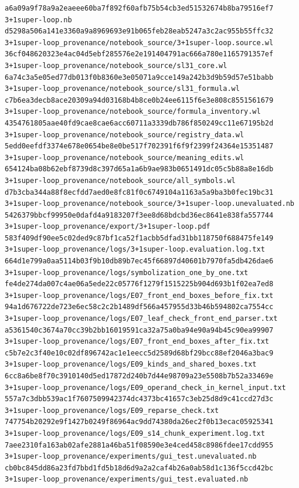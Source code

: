 \documentclass[
  10pt,
]{article}
\begin{document}
\begin{verbatim}
a6a09a9f78a9a2eaeee60ba7f892f60afb75b54cb3ed51532674b8ba79516ef7  3+1super-loop.nb
d5298a506a141e3360a9a8969693e91b065feb28eab5247a3c2ac955b55ffc32  3+1super-loop_provenance/notebook_source/3+1super-loop.source.wl
36cf048620323e4ac04d5ebf285576e2e191404791ac666a780e1165791357ef  3+1super-loop_provenance/notebook_source/sl31_core.wl
6a74c3a5e05ed77db013f0b8360e3e05071a9cce149a242b3d9b59d57e51babb  3+1super-loop_provenance/notebook_source/sl31_formula.wl
c7b6ea3decb8ace20309a94d03168b4b8ce0b24ee6115f6e3e808c8551561679  3+1super-loop_provenance/notebook_source/formula_inventory.wl
4354761805aae40fd9cae8cae6acc60711a3339db786f850249cc11e67195b2d  3+1super-loop_provenance/notebook_source/registry_data.wl
5edd0eefdf3374e678e0654be8e0be517f702391f6f9f2399f24364e15351487  3+1super-loop_provenance/notebook_source/meaning_edits.wl
654124ba08b62ebf8739d8c397d65a1a6b9ae983b0651491dc05c5b88a8e16db  3+1super-loop_provenance/notebook_source/all_symbols.wl
d7b3cba344a88f8ecfdd7aed0e8fc81f0c6749104a1163a5a9ba3b0fec19bc31  3+1super-loop_provenance/notebook_source/3+1super-loop.unevaluated.nb
5426379bbcf99950e0dafd4a9183207f3ee8d68bdcbd36ec8641e838fa557744  3+1super-loop_provenance/export/3+1super-loop.pdf
583f409df90ee5c02ded9c87bf1ca52f1acbb5dfad31bb118750f688475fe149  3+1super-loop_provenance/logs/3+1super-loop.evaluation.log.txt
664d1e799a0aa5114b03f9b10db89b7ec45f66897d40601b7970fa5db426dae6  3+1super-loop_provenance/logs/symbolization_one_by_one.txt
fe4de274da007c4ae06a5ede22c05776f1279f1515225b904d693b1f02ea7ed8  3+1super-loop_provenance/logs/E07_front_end_boxes_before_fix.txt
94a1d676722de723e6ec58c2c2b1489df566a457955d33b46b594802ca7554cc  3+1super-loop_provenance/logs/E07_leaf_check_front_end_parser.txt
a5361540c3674a70cc39b2bb16019591ca32a75a0ba94e90a94b45c90ea99907  3+1super-loop_provenance/logs/E07_front_end_boxes_after_fix.txt
c5b7e2c3f40e10c02df896742ac1e1eecc5d2589d68bf29bcc88ef2046a3bac9  3+1super-loop_provenance/logs/E09_kinds_and_shared_boxes.txt
6cc8a6be8f70c3910140d5ed17872d240b7d44e98709a23e5508b7b52a33469e  3+1super-loop_provenance/logs/E09_operand_check_in_kernel_input.txt
557a7c3dbb539ac1f7607509942374dc4373bc41657c3eb25d8d9c41ccd27d3c  3+1super-loop_provenance/logs/E09_reparse_check.txt
747754b20292e9f1427b0249f86964ac9dd74380da26ec2f0b13ecac05925341  3+1super-loop_provenance/logs/E09_s14_chunk_experiment.log.txt
7aee2310fa163ab02afe2881a46ba51f08590e3e4ced458c8986fdee17cdd955  3+1super-loop_provenance/experiments/gui_test.unevaluated.nb
cb0bc845dd86a23fd7bbd1fd5b18d6d9a2a2caf4b26a0ab58d1c136f5ccd42bc  3+1super-loop_provenance/experiments/gui_test.evaluated.nb

\end{verbatim}
\end{document}

